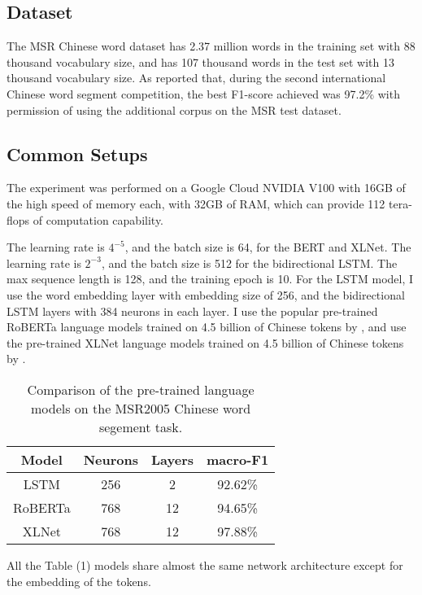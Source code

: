 \documentclass[11pt,a4paper]{article}
\begin{document}
\subsection{Dataset}

 The MSR Chinese word dataset has 2.37 million words in the training set with 88 thousand vocabulary size,
 and has 107 thousand words in the test set with 13 thousand vocabulary size.
 As \citet{emerson2005second} reported that, during the second international Chinese word segment competition,
the best F1-score achieved was 97.2\% with permission of using the additional corpus on the MSR test dataset.

\subsection{Common Setups}

The experiment was performed on a Google Cloud NVIDIA V100 with 16GB of the high speed of memory each, with 32GB of RAM,
which can provide 112 tera-flops of computation capability.

The learning rate is $4^{-5}$, and the batch size is 64, for the BERT and XLNet.
The learning rate is $2^{-3}$, and the batch size is 512 for the bidirectional LSTM.
The max sequence length is 128, and the training epoch is 10.
For the LSTM model, I use the word embedding layer with embedding size of 256, and the bidirectional LSTM layers with 384 neurons in each layer.
I use the popular pre-trained RoBERTa language models trained on 4.5 billion of Chinese tokens by \citet{cui2020revisiting},
and use the pre-trained XLNet language models trained on 4.5 billion of Chinese tokens by \citet{cui2020revisiting}.

\begin{table}
\centering
\begin{tabular}{cccc}
\hline
\textbf{Model} & \textbf{Neurons}& \textbf{Layers} & \textbf{macro-F1} \\
\hline
LSTM & 256 & 2 & 92.62\% \\
RoBERTa & 768 & 12 & 94.65\% \\
XLNet & 768 & 12 & 97.88\% \\
\hline
\end{tabular}
\caption{Comparison of the pre-trained language models on the MSR2005 Chinese word segement task.}
\end{table}


All the Table (1) models share almost the same network architecture except for the embedding of the tokens.
\end{document}
